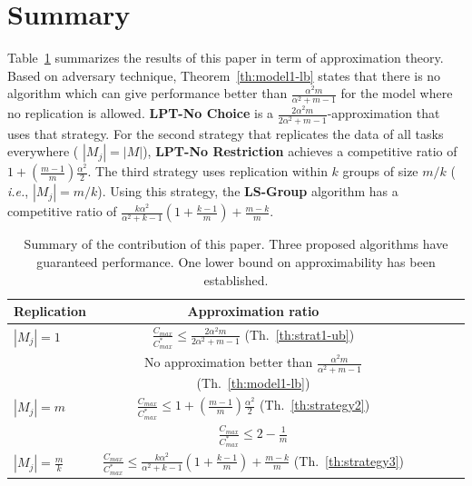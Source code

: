 \documentclass[10pt, conference, compsocconf]{IEEEtran}
\begin{document}
\section{Summary}\label{sec7}
Table~\ref{tab:template} summarizes the results of this paper in term
of approximation theory. Based on adversary technique,
Theorem~\ref{th:model1-lb} states that there is no algorithm which can
give performance better than $\frac{\alpha^{2}m }{\alpha^{2} + m-1}$ for the model where no
replication is allowed. {\bf LPT-No Choice} is a
$\frac{2\alpha^{2}m}{2\alpha^{2}+ m-1}$-approximation that uses that
strategy. For the second strategy that replicates the data of all
tasks everywhere ( $|M_j| = |M|$), {\bf LPT-No Restriction} achieves a
competitive ratio of $1 + (\frac{m-1}{m})\frac{\alpha^{2}}{2}$.  The
third strategy uses replication within $k$ groups of size $m/k$ ({\em
  i.e.}, $|M_j| = m/k$). Using this strategy, the {\bf LS-Group}
algorithm has a competitive ratio of
$\frac{k\alpha^{2}}{\alpha^{2}+k-1}\left( 1+ {\frac{k-1}{m}} \right) +
{\frac{m-k}{m}}$.



\begin{table}[ht]
  \centering
  \begin{tabular}{|l|c|c|c|c|c|}
    \hline
    Replication & Approximation ratio  \\
    \hline
    $|M_j|=1$ & $\frac{C_{max}}{C_{max}^{*}}\leq \frac{2\alpha^{2}m}{2\alpha^{2}+ m-1}$ (Th.~\ref{th:strat1-ub})  \\
    & No approximation better than $\frac{\alpha^{2}m }{\alpha^{2} + m-1}$ (Th.~\ref{th:model1-lb})   \\
    
    \hline
    $|M_j|=m$ & $\frac{C_{max}}{C_{max}^{*}} \leq 1 + (\frac{m-1}{m})\frac{\alpha^{2}}{2}$ (Th.~\ref{th:strategy2})  \\
    & $\frac{C_{max}}{C_{max}^{*}} \leq 2-\frac{1}{m}$ \cite{Graham66}   \\
    \hline
    
    $|M_j|= \frac{m}{k} $ & $\frac{C_{max}}{C_{max}^{*}} \leq \frac{k\alpha^{2}}{\alpha^{2}+k-1} \left(1+ {\frac{k-1}{m}} \right)+ {\frac{m-k}{m}}$ (Th.~\ref{th:strategy3})  \\
    
    \hline
  \end{tabular}
  \caption{Summary of the contribution of this paper.
    Three proposed algorithms have guaranteed performance.
    One lower bound on approximability has been established.}
  \label{tab:template}
\end{table}
\end{document}
